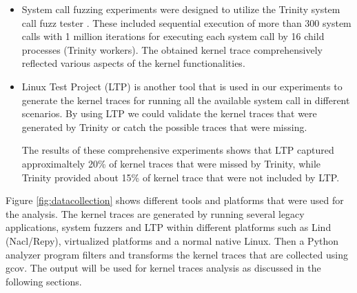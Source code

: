 \begin{itemize}
\item System call fuzzing experiments were designed to utilize the Trinity
 system call fuzz tester \cite{Trinity}. These included sequential execution of more than 300 system calls with 1 million iterations for executing each system call by 16 child processes (Trinity workers). The obtained kernel trace comprehensively reflected various aspects of the kernel functionalities.

\item Linux Test Project (LTP) \cite{LTP} is another tool that is used in our experiments to generate the kernel traces for running all the available system call in different scenarios. By using LTP we could validate the kernel traces that were generated by Trinity or catch the possible traces that were missing.

The results of these comprehensive experiments shows that LTP captured approximaltely 20\% of kernel traces that were missed by Trinity, while Trinity provided about 15\% of kernel trace that were not included by LTP.

\end{itemize}

Figure \ref{fig:datacollection} shows different tools and platforms that were used
 for the analysis. The kernel traces are generated by running several legacy
  applications, system fuzzers and LTP within different platforms such as
  Lind (Nacl/Repy), virtualized platforms and a normal native Linux. Then a Python
   analyzer program filters and transforms the kernel traces that are collected
    using gcov. The output will be used for kernel traces analysis as
    discussed in the following sections.


